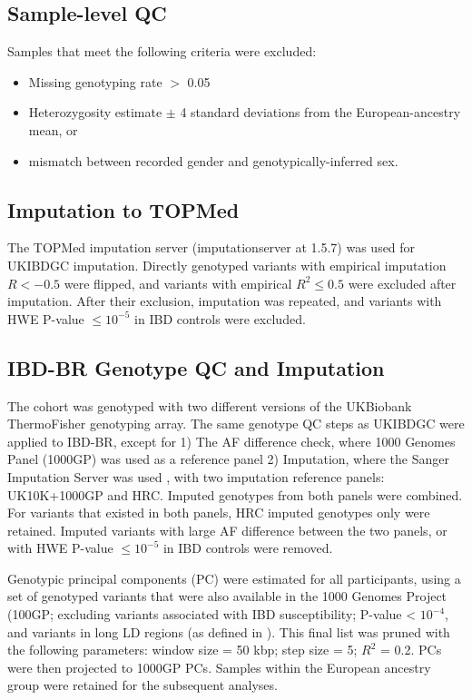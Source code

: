\subsection{Sample-level QC}
Samples that meet the following criteria were excluded:
\begin{itemize}
\item Missing genotyping rate $>$ 0.05
\item Heterozygosity estimate $\pm$ 4 standard deviations from the European-ancestry mean, or 
\item mismatch between recorded gender and genotypically-inferred sex. 
\end{itemize}
\subsection{Imputation to TOPMed}
The TOPMed imputation server (imputationserver at 1.5.7) was used for UKIBDGC imputation. Directly genotyped variants with empirical imputation $R < -0.5$ were flipped, and variants with empirical $R^{2} \leq 0.5$ were excluded after imputation. After their exclusion, imputation was repeated, and variants with HWE P-value $\leq 10^{-5}$ in IBD controls were excluded.

\subsection{IBD-BR Genotype QC and Imputation}
The cohort was genotyped with two different versions of the UKBiobank ThermoFisher genotyping array. The same genotype QC steps as UKIBDGC were applied to IBD-BR, except for 1) The AF difference check, where 1000 Genomes Panel (1000GP) was used as a reference panel 2) Imputation, where the Sanger Imputation Server was used \cite{1000gp}, with two imputation reference panels: UK10K+1000GP and HRC. Imputed genotypes from both panels were combined. For variants that existed in both panels, HRC imputed genotypes only were retained. Imputed variants with large AF difference between the two panels, or with HWE P-value $ \leq 10^{-5}$ in IBD controls  were removed.

Genotypic principal components (PC) were estimated for all participants, using a set of genotyped variants that were also available in the 1000 Genomes Project (100GP; excluding variants associated with IBD susceptibility; P-value < $10^{-4}$, and variants in long LD regions (as defined in \cite{plink_high_ld}). This final list was pruned with the following parameters: window size = 50 kbp; step size = 5; $R^{2}$ = 0.2. PCs were then projected to 1000GP PCs. Samples within the European ancestry group were retained for the subsequent analyses. 


